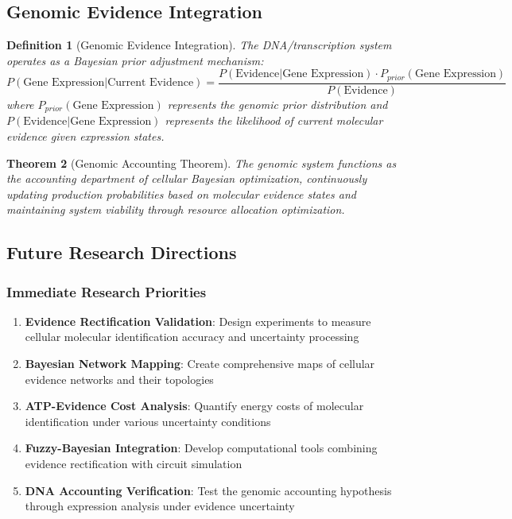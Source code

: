 \documentclass[12pt,a4paper]{article}
\newtheorem{theorem}{Theorem}[section]
\newtheorem{definition}[theorem]{Definition}
\begin{document}
\subsection{Genomic Evidence Integration}

\begin{definition}[Genomic Evidence Integration]
The DNA/transcription system operates as a Bayesian prior adjustment mechanism:
\begin{equation}
P(\text{Gene Expression} | \text{Current Evidence}) = \frac{P(\text{Evidence} | \text{Gene Expression}) \cdot P_{prior}(\text{Gene Expression})}{P(\text{Evidence})}
\end{equation}
where $P_{prior}(\text{Gene Expression})$ represents the genomic prior distribution and $P(\text{Evidence} | \text{Gene Expression})$ represents the likelihood of current molecular evidence given expression states.
\end{definition}

\begin{theorem}[Genomic Accounting Theorem]
The genomic system functions as the accounting department of cellular Bayesian optimization, continuously updating production probabilities based on molecular evidence states and maintaining system viability through resource allocation optimization.
\end{theorem}

\subsection{Future Research Directions}

\subsubsection{Immediate Research Priorities}

\begin{enumerate}
\item \textbf{Evidence Rectification Validation}: Design experiments to measure cellular molecular identification accuracy and uncertainty processing
\item \textbf{Bayesian Network Mapping}: Create comprehensive maps of cellular evidence networks and their topologies
\item \textbf{ATP-Evidence Cost Analysis}: Quantify energy costs of molecular identification under various uncertainty conditions
\item \textbf{Fuzzy-Bayesian Integration}: Develop computational tools combining evidence rectification with circuit simulation
\item \textbf{DNA Accounting Verification}: Test the genomic accounting hypothesis through expression analysis under evidence uncertainty
\end{enumerate}
\end{document}
